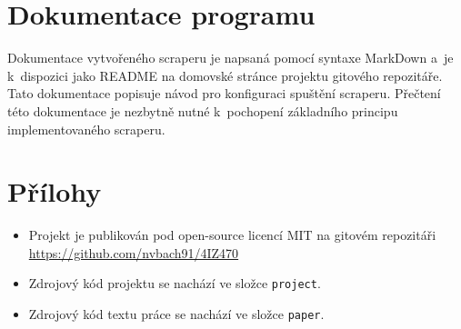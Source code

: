 \documentclass[11pt,a4paper]{article}
\begin{document}
\section{Dokumentace programu}
Dokumentace vytvořeného scraperu je napsaná pomocí syntaxe MarkDown a~je k~dispozici jako README na domovské stránce projektu gitového repozitáře. Tato dokumentace popisuje návod pro konfiguraci spuštění scraperu. Přečtení této dokumentace je nezbytně nutné k~pochopení základního principu implementovaného scraperu.


\newpage






\section*{Přílohy}
\begin{itemize}
\item Projekt je publikován pod open-source licencí MIT na gitovém repozitáři \\ \url{https://github.com/nvbach91/4IZ470} 
\item Zdrojový kód projektu se nachází ve složce \texttt{project}.
\item Zdrojový kód textu práce se nachází ve složce \texttt{paper}.
\end{itemize}
\end{document}
